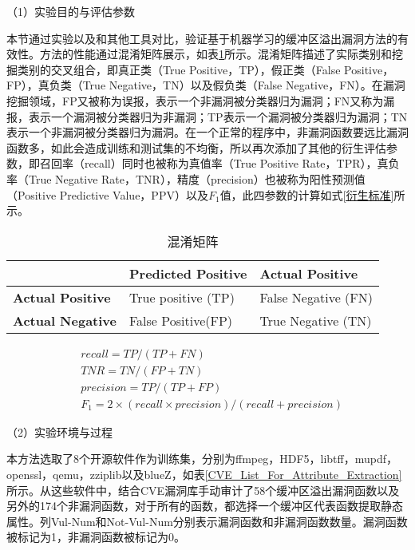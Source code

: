 {（1）实验目的与评估参数

本节通过实验以及和其他工具对比，验证基于机器学习的缓冲区溢出漏洞方法的有效性。方法的性能通过混淆矩阵展示，如表\ref{confusion_matrix}所示。混淆矩阵描述了实际类别和挖掘类别的交叉组合，即真正类（True Positive，TP），假正类（False Positive，FP），真负类（True Negative，TN）以及假负类（False Negative，FN）。在漏洞挖掘领域，FP又被称为误报，表示一个非漏洞被分类器归为漏洞；FN又称为漏报，表示一个漏洞被分类器归为非漏洞；TP表示一个漏洞被分类器归为漏洞；TN表示一个非漏洞被分类器归为漏洞。在一个正常的程序中，非漏洞函数要远比漏洞函数多，如此会造成训练和测试集的不均衡，所以再次添加了其他的衍生评估参数，即召回率（recall）同时也被称为真值率（True Positive Rate，TPR），真负率（True Negative Rate，TNR），精度（precision）也被称为阳性预测值（Positive Predictive Value，PPV）以及$F_1$值，此四参数的计算如式\ref{衍生标准}所示。

\begin{table}[ht]
\begin{center}
\caption{混淆矩阵} \label{confusion_matrix}
\begin{small}
\begin{tabular}{lll}
\hline
 & {\bf Predicted Positive} & {\bf Actual Positive}\\ \hline
{\bf Actual Positive} & True positive (TP) & False Negative (FN)\\ \hline
{\bf Actual Negative} & False Positive(FP) & True Negative (TN)\\ \hline
\end{tabular}
\end{small}
\end{center}
\end{table}

\begin{equation}
\begin{split}
\label{衍生标准}
& recall = TP/(TP+FN) \\
& TNR = TN/(FP+TN) \\
& precision = TP/(TP+FP) \\
& F_1 = 2 \times (recall \times precision)/(recall + precision)
\end{split}
\end{equation}

（2）实验环境与过程

本方法选取了8个开源软件作为训练集，分别为ffmpeg，HDF5，libtff，mupdf，openssl，qemu，zziplib以及blueZ，如表\ref{CVE_List_For_Attribute_Extraction}所示。从这些软件中，结合CVE漏洞库手动审计了58个缓冲区溢出漏洞函数以及另外的174个非漏洞函数，对于所有的函数，都选择一个缓冲区代表函数提取静态属性。列Vul-Num和Not-Vul-Num分别表示漏洞函数和非漏洞函数数量。漏洞函数被标记为1，非漏洞函数被标记为0。

}
